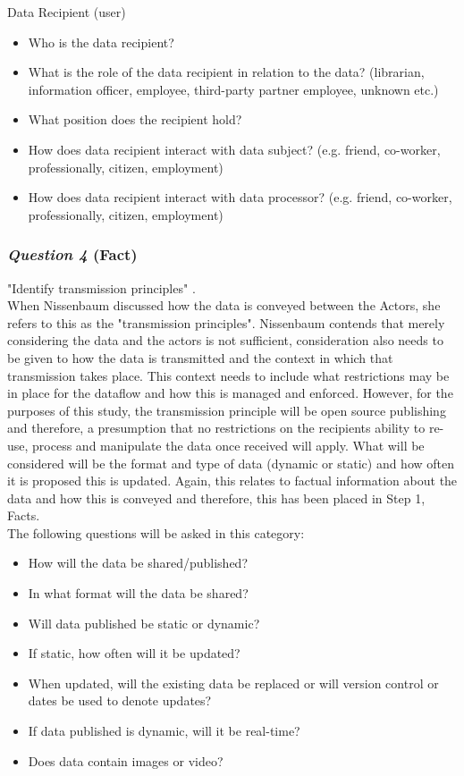 Data Recipient (user)
\begin{itemize}
\item Who is the data recipient?
\item What is the role of the data recipient in relation to the data? (librarian, information officer, employee, third-party partner employee, unknown etc.)
\item What position does the recipient hold?
\item How does data recipient interact with data subject? (e.g. friend, co-worker, professionally, citizen, employment)
\item How does data recipient interact with data processor? (e.g. friend, co-worker, professionally, citizen, employment) 
\end{itemize}

\subsubsection {{\it Question 4} {\bf (Fact)}}
"Identify transmission principles" \citep{Nissenbaum_2010}.\\

When Nissenbaum discussed how the data is conveyed between the Actors, she refers to this as the "transmission principles". Nissenbaum contends that merely considering the data and the actors is not sufficient, consideration also needs to be given to how the data is transmitted and the context in which that transmission takes place. This context needs to include what restrictions may be in place for the dataflow and how this is managed and enforced. However, for the purposes of this study, the transmission principle will be open source publishing and therefore, a presumption that no restrictions on the recipients ability to re-use, process and manipulate the data once received will apply. What will be considered will be the format and type of data (dynamic or static) and how often it is proposed this is updated. Again, this relates to factual information about the data and how this is conveyed and therefore, this has been placed in Step 1, Facts. \\
The following questions will be asked in this category:
\begin{itemize}
\item How will the data be shared/published?
\item In what format will the data be shared?
\item Will data published be static or dynamic?
\item If static, how often will it be updated?
\item When updated, will the existing data be replaced or will version control or dates be used to denote updates?
\item If data published is dynamic, will it be real-time?
\item Does data contain images or video?
\end{itemize}
